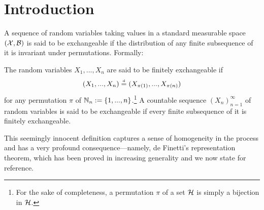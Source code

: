 

\section{Introduction}


A sequence of random variables taking values in a standard measurable space $(\mathcal{X}, \mathcal{B})$ is said to be exchangeable if the distribution of any finite subsequence of it is invariant under permutations. Formally:

\begin{definition}[Exchangeability] \label{def:exchangeability}
	The random variables $X_1, ..., X_n$ are said to be finitely exchangeable if
	\begin{equation*}
		(X_1, ..., X_n) \stackrel{\text{\rm\tiny d}}{=} (X_{\pi(1)}, ..., X_{\pi(n)})
	\end{equation*}
	for any permutation $\pi$ of $\mathbb{N}_n :=\{1, ..., n \}$.\footnote{For the sake of completeness, a permutation $\pi$ of a set $\mathcal{H}$ is simply a bijection in $\mathcal{H}$.} A countable sequence $(X_n)_{n=1}^{\infty}$ of random variables is said to be exchangeable if every finite subsequence of it is finitely exchangeable.
\end{definition}





This seemingly innocent definition captures a sense of homogeneity in the process and has a very profound consequence---namely, de Finetti's representation theorem, which has been proved in increasing generality \cite{deFinetti:1930:RepTheorem, HewittSavage:1955:rep_theorem, DiaconisFreedman:1978:Generalizations} and we now state for reference.

